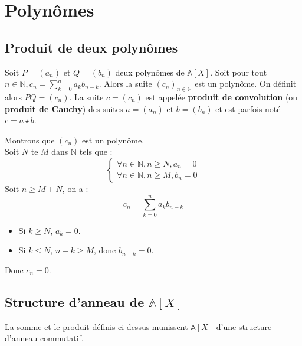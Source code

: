 \documentclass[../main.tex]{subfiles}
\begin{document}
\setcounter{chapter}{12}
\chapter{Polynômes}
\tableofcontents
\clearpage

\setcounter{section}{5}
\section{Produit de deux polynômes}

\begin{tcolorbox}[title=Définition 13.6, title filled=false, colframe=orange, colback=orange!10!white]
    Soit $P = (a_n)$ et $Q = (b_n)$ deux polynômes de $\mathbb{A}[X]$. Soit pour tout $n \in \mathbb{N}, c_n = \sum_{k=0}^{n} a_k b_{n-k}$. Alors la suite $(c_n)_{n \in \mathbb{N}}$ est un polynôme. On définit alors $PQ = (c_n)$. La suite $c = (c_n)$ est appelée \textbf{produit de convolution} (ou \textbf{produit de Cauchy}) des suites $a = (a_n)$ et $b = (b_n)$ et est parfois noté $c = a \star b$.
\end{tcolorbox}

Montrons que $(c_n)$ est un polynôme. \\
Soit $N$ te $M$ dans $\mathbb{N}$ tels que : 
$$
\begin{cases}
    \forall n \in \mathbb{N}, n \geq N, a_n = 0 \\
    \forall n \in \mathbb{N}, n \geq M, b_n = 0
\end{cases}
$$
Soit $n \geq M + N$, on a : 
$$c_n = \sum_{k=0}^{n} a_k b_{n-k}$$
\begin{itemize}
    \item Si $k \geq N$, $a_k = 0$. 
    \item Si $k \leq N$, $n-k \geq M$, donc $b_{n-k} = 0$.
\end{itemize}
Donc $c_n = 0$. 

\section{Structure d'anneau de $\mathbb{A}[X]$}

\begin{tcolorbox}[title=Théorème 13.7, title filled=false, colframe=orange, colback=orange!10!white]
    La somme et le produit définis ci-dessus munissent $\mathbb{A}[X]$ d'une structure d'anneau commutatif. 
\end{tcolorbox}
\end{document}
